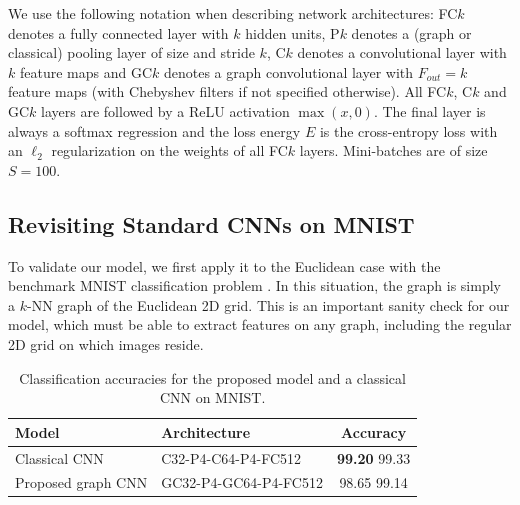 \documentclass{article}
\newcommand{\todo}[1]{{\color{red} #1 }}
\begin{document}
We use the following notation when describing network architectures: FC$k$
denotes a fully connected layer with $k$ hidden units, P$k$ denotes a (graph or
classical) pooling layer of size and stride $k$, C$k$ denotes a convolutional
layer with $k$ feature maps and GC$k$ denotes a graph convolutional layer with
$F_{out} = k$ feature maps (with Chebyshev filters if not specified otherwise).
All FC$k$, C$k$ and GC$k$ layers are followed by a ReLU activation $\max(x,0)$.
The final layer is always a softmax regression and the loss energy $E$ is the
cross-entropy loss with an $\ell_2$ regularization on the weights of all
FC$k$ layers. Mini-batches are of size $S = 100$.  %













\subsection{Revisiting Standard CNNs on MNIST} \label{sec:MNIST}

To validate our model, we first apply it to the Euclidean case with the benchmark MNIST classification
problem \cite{pro:LeCunBottouBengioHaffner98MNIST}. In this situation, the graph is simply a $k$-NN graph of the Euclidean 2D grid. This is an important sanity check for our model, which must be able to extract
features on any graph, including the regular 2D grid on which images reside.


\begin{table}[h!]
\centering
\begin{tabular}{llc}
\toprule
Model & Architecture & Accuracy \\
\midrule
Classical CNN & C32-P4-C64-P4-FC512 & \textbf{99.20} \todo{99.33} \\
Proposed graph CNN & GC32-P4-GC64-P4-FC512 & 98.65 \todo{99.14} \\
\bottomrule
\end{tabular}
\caption{Classification accuracies for the proposed model and a classical CNN on
MNIST.} 
\label{tab:mnist}
\end{table}
\end{document}
